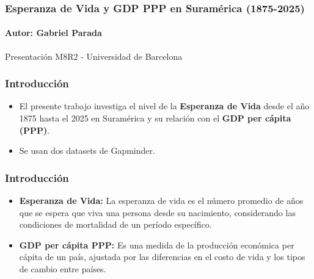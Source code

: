 \documentclass{beamer}
\begin{document}


\begin{frame}
\frametitle{Esperanza de Vida y GDP PPP en Suramérica (1875-2025)}
\framesubtitle{Autor: Gabriel Parada}
Presentación M8R2 - Universidad de Barcelona
\end{frame}


\begin{frame}
\frametitle{Introducción}
\begin{itemize}
\item<1-> El presente trabajo investiga el nivel de la \textbf{Esperanza de Vida} desde el año 1875 hasta el 2025 en Suramérica y su relación con el \textbf{GDP per cápita (PPP)}. 
\item<2-> Se usan dos datasets de Gapminder.
\end{itemize}
\end{frame}


\begin{frame}
\frametitle{Introducción}
\begin{itemize}
\item<1> \textbf{Esperanza de Vida:} La esperanza de vida es el número promedio de años que se espera que viva una persona desde su nacimiento, considerando las condiciones de mortalidad de un período específico.
\item<2> \textbf{GDP per cápita PPP:} Es una medida de la producción económica per cápita de un país, ajustada por las diferencias en el costo de vida y los tipos de cambio entre países.	
\end{itemize}
\end{frame}
\end{document}
